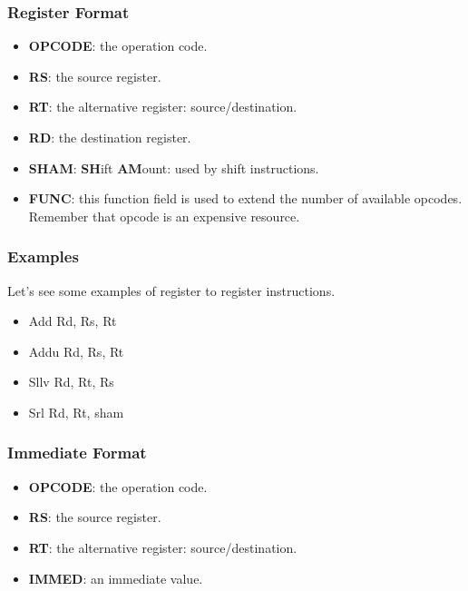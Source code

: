
\begin{frame}
  \frametitle{Register Format}

  \begin{center}
  \end{center}

  \begin{itemize}[<+->]
    \item
      \textbf{OPCODE}: the operation code.
    \item
      \textbf{RS}: the source register.
    \item
      \textbf{RT}: the alternative register: source/destination.
    \item
      \textbf{RD}: the destination register.
    \item
      \textbf{SHAM}: \textbf{SH}ift \textbf{AM}ount: used by
      shift instructions.
    \item
      \textbf{FUNC}: this function field is used to extend the number
      of available opcodes. Remember that opcode is an expensive resource.
  \end{itemize}
\end{frame}


\begin{frame}[containsverbatim]
  \frametitle{Examples}

  Let's see some examples of register to register instructions.

  \begin{itemize}[<+->]
    \item
      Add Rd, Rs, Rt
    \item
      Addu Rd, Rs, Rt
    \item
      Sllv Rd, Rt, Rs
    \item
      Srl Rd, Rt, sham
  \end{itemize}
\end{frame}


\begin{frame}
  \frametitle{Immediate Format}

  \begin{center}
  \end{center}

  \begin{itemize}[<+->]
    \item
      \textbf{OPCODE}: the operation code.
    \item
      \textbf{RS}: the source register.
    \item
      \textbf{RT}: the alternative register: source/destination.
    \item
      \textbf{IMMED}: an immediate value.
  \end{itemize}
\end{frame}

